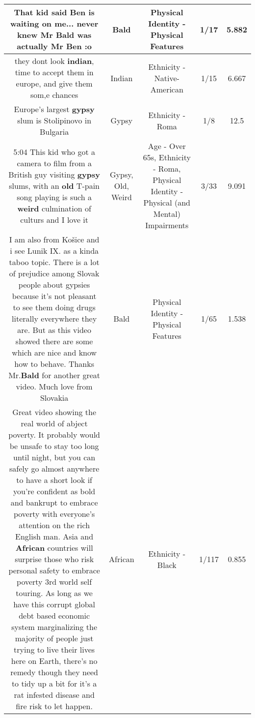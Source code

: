 \documentclass[11pt]{article}
\newlength\mylength
\begin{document}
\begin{center}
\begin{longtable}{|C{.65\mylength}|C{.30\mylength}|C{.12\mylength}|C{.12\mylength}|C{.12\mylength}|}
  \small That kid said Ben is waiting on me... never knew Mr \textbf{Bald} was actually Mr Ben :o\normalsize   & Bald & Physical Identity - Physical Features & 1/17 & 5.882 \\  \hline
  \small they dont look \textbf{indian}, time to accept them in europe, and give them som,e chances\normalsize   & Indian & Ethnicity - Native-American & 1/15 & 6.667 \\  \hline
  \small Europe's largest \textbf{gypsy} slum is Stolipinovo in Bulgaria\normalsize   & Gypsy & Ethnicity - Roma & 1/8 & 12.5 \\  \hline
  \small 5:04 This kid who got a camera to film from a British guy visiting \textbf{gypsy} slums, with an \textbf{old} T-pain song playing is such a \textbf{weird} culmination of culturs and I love it\normalsize   & Gypsy, Old, Weird & Age - Over 65s, Ethnicity - Roma, Physical Identity - Physical (and Mental) Impairments & 3/33 & 9.091 \\  \hline
  \small I am also from Košice and i see Lunik IX. as a kinda taboo topic. There is a lot of prejudice among Slovak people about gypsies because it's not pleasant to see them doing drugs literally everywhere they are. But as this video showed there are some which are nice and know how to behave. Thanks Mr.\textbf{Bald} for another great video. Much love from Slovakia\normalsize   & Bald & Physical Identity - Physical Features & 1/65 & 1.538 \\  \hline
  \small Great video showing the real world of abject poverty. It probably would be unsafe to stay too long until night, but you can safely go almost anywhere to have a short look if you're confident as bold and bankrupt to embrace poverty with everyone's attention on the rich English man. Asia and \textbf{African} countries will surprise those who risk personal safety to embrace poverty 3rd world self touring. As long as we have this corrupt global debt based economic system marginalizing the majority of people just trying to live their lives here on Earth, there's no remedy though they need to tidy up a bit for it's a rat infested disease and fire risk to let happen.\normalsize   & African & Ethnicity - Black & 1/117 & 0.855 \\  \hline

\end{longtable}
\end{center}
\end{document}
